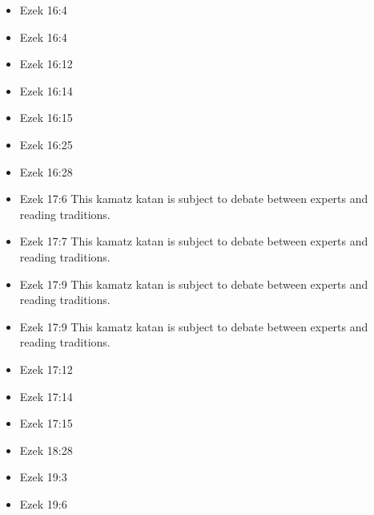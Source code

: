 \documentclass[14pt]{book}
\begin{document}
\begin{multicols}{2}
\begin{itemize}
										\item Ezek 16:4
										
										\item Ezek 16:4
										
										\item Ezek 16:12
										
										\item Ezek 16:14
										
										\item Ezek 16:15
										
										\item Ezek 16:25
										
										\item Ezek 16:28
										
										\item Ezek 17:6 This kamatz katan is subject to debate between experts and reading traditions.
										
										\item Ezek 17:7 This kamatz katan is subject to debate between experts and reading traditions.
										
										\item Ezek 17:9 This kamatz katan is subject to debate between experts and reading traditions.
										
										\item Ezek 17:9 This kamatz katan is subject to debate between experts and reading traditions.
										
										\item Ezek 17:12
										
										\item Ezek 17:14
										
										\item Ezek 17:15
										
										\item Ezek 18:28
										
										\item Ezek 19:3
										
										\item Ezek 19:6
										

\end{itemize}
\end{multicols}
\end{document}
